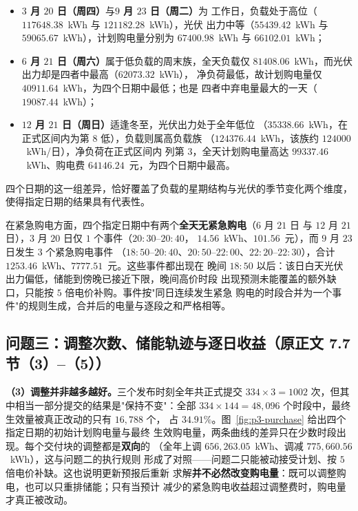 \begin{itemize}
  \item \textbf{$3$ 月 $20$ 日（周四）}与\textbf{$9$ 月 $23$ 日（周二）}为
        工作日，负载处于高位（$117648.38$~kWh 与 $121182.28$~kWh），光伏
        出力中等（$55439.42$~kWh 与 $59065.67$~kWh），计划购电量分别为
        $67400.98$~kWh 与 $66102.01$~kWh；
  \item \textbf{$6$ 月 $21$ 日（周六）}属于低负载的周末族，全天负载仅
        $81408.06$~kWh，而光伏出力却是四者中最高（$62073.32$~kWh），
        净负荷最低，故计划购电量仅 $40911.64$~kWh，为四个日期中最低；也是
        四者中弃电量最大的一天（$19087.44$~kWh）；
  \item \textbf{$12$ 月 $21$ 日（周日）}适逢冬至，光伏出力处于全年低位
        （$35338.66$~kWh，在正式区间内为第 $8$ 低），负载则属高负载族
        （$124376.44$~kWh，该族约 $124000$~kWh/日），净负荷在正式区间内
        列第 $3$，全天计划购电量高达 $99337.46$~kWh、购电费
        $64146.24$~元，为四个日期中最高。
\end{itemize}

四个日期的这一组差异，恰好覆盖了负载的星期结构与光伏的季节变化两个维度，
使得指定日期的结果具有代表性。

在紧急购电方面，四个指定日期中有两个\textbf{全天无紧急购电}（$6$ 月 $21$ 日
与 $12$ 月 $21$ 日），$3$ 月 $20$ 日仅 $1$ 个事件（$20{:}30$--$20{:}40$，
$14.56$~kWh、$101.56$~元），而 $9$ 月 $23$ 日发生 $3$ 个紧急购电事件
（$18{:}50$--$20{:}40$、$20{:}50$--$22{:}00$、$22{:}20$--$22{:}30$），合计
$1253.46$~kWh、$7777.51$~元。这些事件都出现在
晚间 $18{:}50$ 以后：该日白天光伏出力偏低，储能到傍晚已接近下限，晚间高价时段
出现预测未能覆盖的额外缺口，只能按 $5$ 倍电价补购。事件按"同日连续发生紧急
购电的时段合并为一个事件"的规则生成，合并后的电量与逐段之和严格相等。

\subsection{问题三：调整次数、储能轨迹与逐日收益（原正文 7.7 节（3）--（5））}
\label{app:p3-analysis}

\textbf{（3）调整并非越多越好。}三个发布时刻全年共正式提交
$334\times3=1002$ 次，但其中相当一部分提交的结果是"保持不变"：全部
$334\times144=48{,}096$ 个时段中，最终生效量被真正改动的只有 $16{,}788$ 个，
占 $34.91\%$。图~\ref{fig:p3-purchase} 给出四个指定日期的初始计划购电量与最终
生效购电量，两条曲线的差异只在少数时段出现。每个交付块的调整都是\textbf{双向}的
（全年上调 $656{,}263.05$~kWh、调减 $775{,}660.56$~kWh），这与问题二的执行规则
形成了对照——问题二只能被动接受计划、按 $5$ 倍电价补缺。这也说明更新预报后重新
求解\textbf{并不必然改变购电量}：既可以调整购电，也可以只重排储能；只有当预计
减少的紧急购电收益超过调整费时，购电量才真正被改动。

